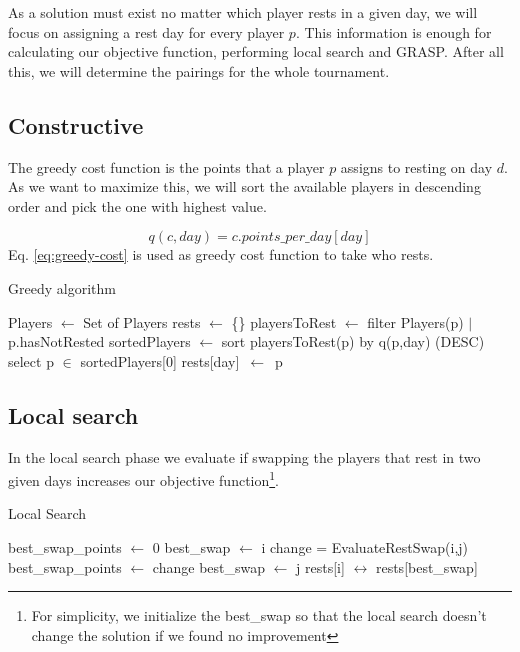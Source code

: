 \documentclass[a4paper, 10pt]{article}
\begin{document}
As a solution must exist no matter which player rests in a given day, we will focus on assigning a rest day for every player $p$. This information is enough for calculating our objective function, performing local search and GRASP. After all this, we will determine the pairings for the whole tournament.

\subsection{Constructive}

The greedy cost function is the points that a player $p$ assigns to resting on day $d$. As we want to maximize this, we will sort the available players in descending order and pick the one with highest value.

\begin{equation}
  \label{eq:greedy-cost}
  q(c,day)= c.points\_per\_day[day]
\end{equation}
Eq. \ref{eq:greedy-cost} is used as greedy cost function to take who rests.


\begin{algorithm}
	\caption{Greedy algorithm} 
	\begin{algorithmic}[1]
	  \State Players $\leftarrow$ Set of Players
	  \State rests $\leftarrow$ \{\}
	      \State playersToRest $\leftarrow$ filter Players(p) $|$ p.hasNotRested
        \State sortedPlayers $\leftarrow$ sort playersToRest(p) by q(p,day) (DESC) 
	      \State select p $\in$ sortedPlayers[0]
	      \State rests[day]\ $\leftarrow$\ p
	    \EndFor
	\end{algorithmic} 
\end{algorithm}


\subsection{Local search}

In the local search phase we evaluate if swapping the players that rest in two given days increases our objective function\footnote{For simplicity, we initialize the best\_swap so that the local search doesn't change the solution if we found no improvement}.

\begin{algorithm}
	\caption{Local Search} 
	\begin{algorithmic}[1]
    \State best\_swap\_points $\leftarrow$ 0
    \State best\_swap $\leftarrow$ i
        \State change = EvaluateRestSwap(i,j)
          \State best\_swap\_points $\leftarrow$ change
          \State best\_swap $\leftarrow$ j
        \EndIf
      \EndFor
      \State rests[i] $\leftrightarrow$ rests[best\_swap]
		\EndFor
	\end{algorithmic} 
\end{algorithm}
\end{document}
